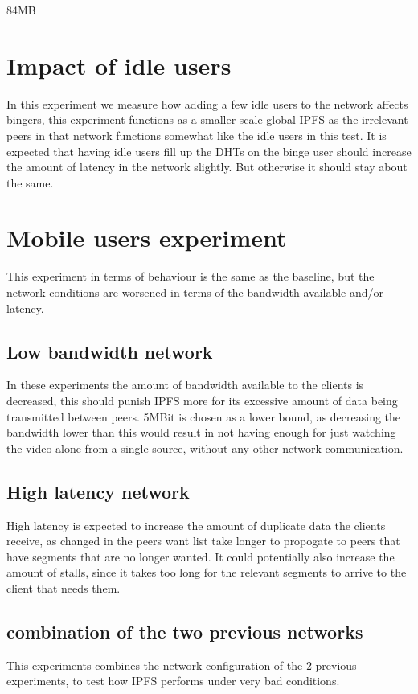 84MB

\section{Impact of idle users}
In this experiment we measure how adding a few idle users to the network affects bingers, this experiment functions as a smaller scale global \acs{IPFS} as the irrelevant peers in that network functions somewhat like the idle users in this test. It is expected that having idle users fill up the \acs{DHT}s on the binge user should increase the amount of latency in the network slightly. But otherwise it should stay about the same.

\section{Mobile users experiment}
This experiment in terms of behaviour is the same as the baseline, but the network conditions are worsened  in terms of the bandwidth available and/or latency. 

\subsection{Low bandwidth network}
In these experiments the amount of bandwidth available to the clients is decreased, this should punish \acs{IPFS} more for its excessive amount of data being transmitted between peers. 5MBit is chosen as a lower bound, as decreasing the bandwidth lower than this would result in not having enough for just watching the video alone from a single source, without any other network communication.

\subsection{High latency network}
High latency is expected to increase the amount of duplicate data the clients receive, as changed in the peers want list take longer to propogate to peers that have segments that are no longer wanted. It could potentially also increase the amount of stalls, since it takes too long for the relevant segments to arrive to the client that needs them.

\subsection{combination of the two previous networks}
This experiments combines the network configuration of the 2 previous experiments, to test how \acs{IPFS} performs under very bad conditions. %

